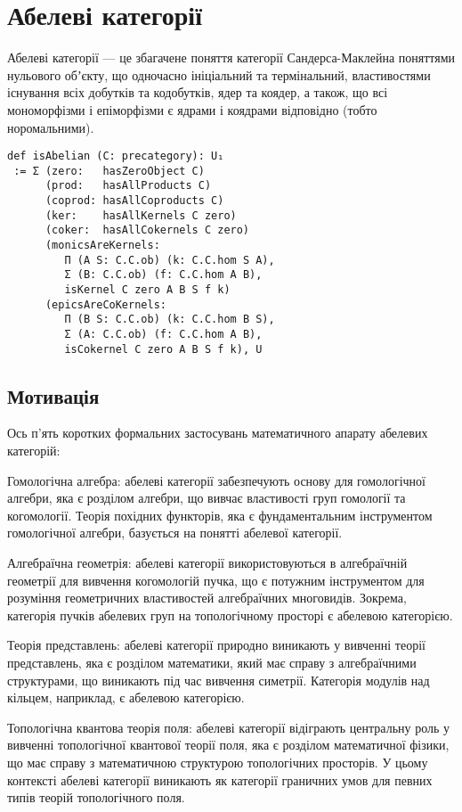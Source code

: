 \section{Абелеві категорії}

Абелеві категорії --- це збагачене поняття категорії Сандерса-Маклейна
поняттями нульового обʼєкту, що одночасно ініціальний та термінальний,
властивостями існування всіх добутків та кодобутків, ядер та коядер,
а також, що всі мономорфізми і епіморфізми є ядрами і коядрами відповідно (тобто норомальними).

\begin{lstlisting}
def isAbelian (C: precategory): U₁
 := Σ (zero:   hasZeroObject C)
      (prod:   hasAllProducts C)
      (coprod: hasAllCoproducts C)
      (ker:    hasAllKernels C zero)
      (coker:  hasAllCokernels C zero)
      (monicsAreKernels:
         Π (A S: C.C.ob) (k: C.C.hom S A),
         Σ (B: C.C.ob) (f: C.C.hom A B),
         isKernel C zero A B S f k)
      (epicsAreCoKernels:
         Π (B S: C.C.ob) (k: C.C.hom B S),
         Σ (A: C.C.ob) (f: C.C.hom A B),
         isCokernel C zero A B S f k), U
\end{lstlisting}    

\subsection*{Мотивація}

Ось п'ять коротких формальних застосувань математичного
апарату абелевих категорій:

Гомологічна алгебра: абелеві категорії забезпечують основу для
гомологічної алгебри, яка є розділом алгебри, що вивчає властивості
груп гомології та когомології. Теорія похідних функторів, яка є
фундаментальним інструментом гомологічної алгебри, базується на
понятті абелевої категорії.

Алгебраїчна геометрія: абелеві категорії використовуються в
алгебраїчній геометрії для вивчення когомологій пучка, що є
потужним інструментом для розуміння геометричних властивостей
алгебраїчних многовидів. Зокрема, категорія пучків абелевих груп
на топологічному просторі є абелевою категорією.

Теорія представлень: абелеві категорії природно виникають у
вивченні теорії представлень, яка є розділом математики, який
має справу з алгебраїчними структурами, що виникають під час
вивчення симетрії. Категорія модулів над кільцем, наприклад, є абелевою категорією.

Топологічна квантова теорія поля: абелеві категорії відіграють
центральну роль у вивченні топологічної квантової теорії поля,
яка є розділом математичної фізики, що має справу з математичною
структурою топологічних просторів. У цьому контексті абелеві
категорії виникають як категорії граничних умов для певних
типів теорій топологічного поля.

